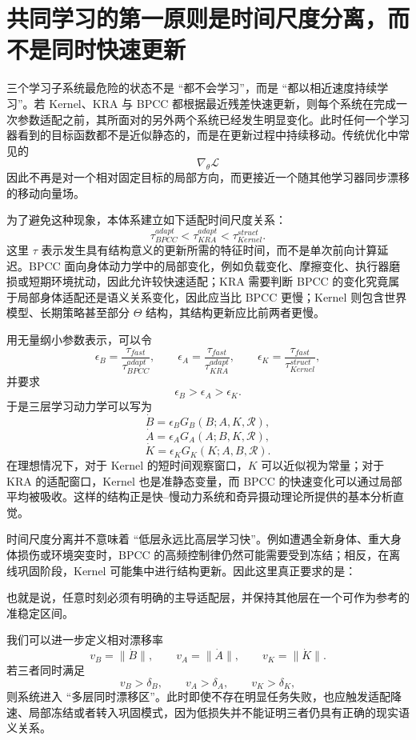 \section{共同学习的第一原则是时间尺度分离，而不是同时快速更新}

三个学习子系统最危险的状态不是 ``都不会学习''，而是 ``都以相近速度持续学习''。若 Kernel、KRA 与 BPCC 都根据最近残差快速更新，则每个系统在完成一次参数适配之前，其所面对的另外两个系统已经发生明显变化。此时任何一个学习器看到的目标函数都不是近似静态的，而是在更新过程中持续移动。传统优化中常见的
\[
\nabla_{\theta}\mathcal{L}
\]
因此不再是对一个相对固定目标的局部方向，而更接近一个随其他学习器同步漂移的移动向量场。

为了避免这种现象，本体系建立如下适配时间尺度关系：
\[
\boxed{
\tau_{BPCC}^{adapt}
<
\tau_{KRA}^{adapt}
<
\tau_{Kernel}^{struct}.
}
\]
这里 $\tau$ 表示发生具有结构意义的更新所需的特征时间，而不是单次前向计算延迟。BPCC 面向身体动力学中的局部变化，例如负载变化、摩擦变化、执行器磨损或短期环境扰动，因此允许较快速适配；KRA 需要判断 BPCC 的变化究竟属于局部身体适配还是语义关系变化，因此应当比 BPCC 更慢；Kernel 则包含世界模型、长期策略甚至部分 $\Theta$ 结构，其结构更新应比前两者更慢。

用无量纲小参数表示，可以令
\[
\epsilon_B
=
\frac{\tau_{fast}}{\tau_{BPCC}^{adapt}},
\qquad
\epsilon_A
=
\frac{\tau_{fast}}{\tau_{KRA}^{adapt}},
\qquad
\epsilon_K
=
\frac{\tau_{fast}}{\tau_{Kernel}^{struct}},
\]
并要求
\[
\epsilon_B
>
\epsilon_A
>
\epsilon_K.
\]
于是三层学习动力学可以写为
\[
\dot B
=
\epsilon_B
G_B(B;A,K,\mathcal R),
\]
\[
\dot A
=
\epsilon_A
G_A(A;B,K,\mathcal R),
\]
\[
\dot K
=
\epsilon_K
G_K(K;A,B,\mathcal R).
\]
在理想情况下，对于 Kernel 的短时间观察窗口，$K$ 可以近似视为常量；对于 KRA 的适配窗口，Kernel 也是准静态变量，而 BPCC 的快速变化可以通过局部平均被吸收。这样的结构正是快--慢动力系统和奇异摄动理论所提供的基本分析直觉。

时间尺度分离并不意味着 ``低层永远比高层学习快''。例如遭遇全新身体、重大身体损伤或环境突变时，BPCC 的高频控制律仍然可能需要受到冻结；相反，在离线巩固阶段，Kernel 可能集中进行结构更新。因此这里真正要求的是：
\begin{statementbox}
\centering
{}
\end{statementbox}
也就是说，任意时刻必须有明确的主导适配层，并保持其他层在一个可作为参考的准稳定区间。

我们可以进一步定义相对漂移率
\[
v_B=\|\dot B\|,
\qquad
v_A=\|\dot A\|,
\qquad
v_K=\|\dot K\|.
\]
若三者同时满足
\[
v_B>\delta_B,
\qquad
v_A>\delta_A,
\qquad
v_K>\delta_K,
\]
则系统进入 ``多层同时漂移区''。此时即使不存在明显任务失败，也应触发适配降速、局部冻结或者转入巩固模式，因为低损失并不能证明三者仍具有正确的现实语义关系。

